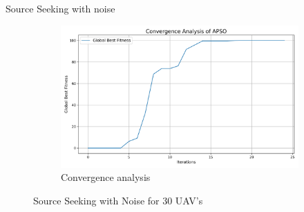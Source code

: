 \documentclass[aspectratio=169]{beamer}
\begin{document}
\begin{frame}{Source Seeking with noise}
\begin{figure}[h]
\begin{subfigure}[b]{0.32\textwidth}
            \includegraphics[width=\textwidth]{plots/r1_with_noise/convergence_analysis.png}
            \caption{Convergence analysis}
        \end{subfigure}
        \caption{Source Seeking with Noise for 30 UAV's}
    \end{figure}
\end{frame}
\end{document}
